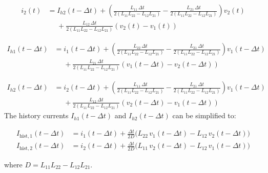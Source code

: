 \begin{equation}
\begin{aligned}
i_2(t)
&= I_{h2}(t-\Delta t)
+ \left(
\frac{L_{11}\,\Delta t}{2\left(L_{11}L_{22}-L_{12}L_{21}\right)}
-
\frac{L_{21}\,\Delta t}{2\left(L_{11}L_{22}-L_{12}L_{21}\right)}
\right) v_2(t) \\
&\phantom{=}
+ \frac{L_{12}\,\Delta t}{2\left(L_{11}L_{22}-L_{12}L_{21}\right)}
\left( v_2(t) - v_1(t) \right)
\end{aligned}
\end{equation}

\begin{equation}
\begin{aligned}
I_{h1}(t-\Delta t)
&= i_1(t-\Delta t)
+ \left(
\frac{L_{22}\,\Delta t}{2\left(L_{11}L_{22}-L_{12}L_{21}\right)}
-
\frac{L_{21}\,\Delta t}{2\left(L_{11}L_{22}-L_{12}L_{21}\right)}
\right) v_1(t-\Delta t) \\
&\phantom{=}
+ \frac{L_{21}\,\Delta t}{2\left(L_{11}L_{22}-L_{12}L_{21}\right)}
\left( v_1(t-\Delta t) - v_2(t-\Delta t) \right)
\end{aligned}
\end{equation}

\begin{equation}
\begin{aligned}
I_{h2}(t-\Delta t)
&= i_2(t-\Delta t)
+ \left(
\frac{L_{11}\,\Delta t}{2\left(L_{11}L_{22}-L_{12}L_{21}\right)}
-
\frac{L_{21}\,\Delta t}{2\left(L_{11}L_{22}-L_{12}L_{21}\right)}
\right) v_1(t-\Delta t) \\
&\phantom{=}
+ \frac{L_{12}\,\Delta t}{2\left(L_{11}L_{22}-L_{12}L_{21}\right)}
\left( v_2(t-\Delta t) - v_1(t-\Delta t) \right)
\end{aligned}
\end{equation}
The history currents $I_{h1}(t-\Delta t)$ and $I_{h2}(t-\Delta t)$ can be simplified to:

\begin{equation}
\begin{aligned}
I_{\text{hist},1}(t-\Delta t)
&=
i_1(t-\Delta t)
+
\frac{\Delta t}{2D}
\Big(
L_{22}\,v_1(t-\Delta t)
-
L_{12}\,v_2(t-\Delta t)
\Big)
\\[6pt]
I_{\text{hist},2}(t-\Delta t)
&=
i_2(t-\Delta t)
+
\frac{\Delta t}{2D}
\Big(
L_{11}\,v_2(t-\Delta t)
-
L_{12}\,v_1(t-\Delta t)
\Big)
\end{aligned}
\end{equation}

where $D = L_{11}L_{22} - L_{12}L_{21}$.

